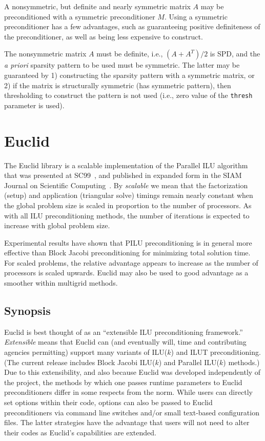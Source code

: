 A nonsymmetric, but definite and nearly symmetric matrix $A$ 
may be preconditioned
with a symmetric preconditioner $M$.  Using a symmetric preconditioner
has a few advantages, such as guaranteeing positive
definiteness of the preconditioner, as well as being less expensive
to construct.

The nonsymmetric matrix $A$ must be definite,
i.e., $(A+A^T)/2$ is SPD, and the {\em a priori} sparsity pattern to be used
must be symmetric.  The latter may be guaranteed by 1) 
constructing the sparsity pattern with a symmetric matrix, or 2) if the
matrix is structurally symmetric (has symmetric pattern), then
thresholding to construct the pattern is not used (i.e.,
zero value of the {\tt thresh} parameter is used).


\section{Euclid}

The Euclid library is a scalable implementation of the Parallel ILU algorithm
that was presented at SC99~\cite{DHysom_APothen_1999}, and published in
expanded form in the SIAM Journal on Scientific
Computing~\cite{DHysom_APothen_2001}.  By {\em scalable} we mean that the
factorization (setup) and application (triangular solve) timings remain nearly
constant when the global problem size is scaled in proportion to the number of
processors.  As with all ILU preconditioning methods, the number of iterations
is expected to increase with global problem size.

Experimental results have shown that PILU preconditioning is in general
more effective than Block Jacobi preconditioning 
for minimizing total solution time.
For scaled problems, the relative advantage appears to increase 
as the number of processors is scaled upwards.
Euclid may also be used to good advantage as a smoother within 
multigrid methods.


\subsection{Synopsis}

Euclid is best thought of as an ``extensible ILU preconditioning
framework.''
{\em Extensible} means that Euclid can (and eventually will, time and
contributing agencies permitting) support many variants of ILU($k$)
and ILUT preconditioning.
(The current release includes Block Jacobi ILU($k$) and
Parallel ILU($k$) methods.)
Due to this extensibility, and also because Euclid was developed 
independently of the \hypre{} project, the methods by which one
passes runtime parameters to Euclid preconditioners
differ in some respects from the \hypre{} norm.
While users can directly set options within their code,
options can also be passed to Euclid preconditioners via
command line switches and/or small text-based configuration files.
The latter strategies have the advantage that users will not need to
alter their codes as Euclid's capabilities are extended.

